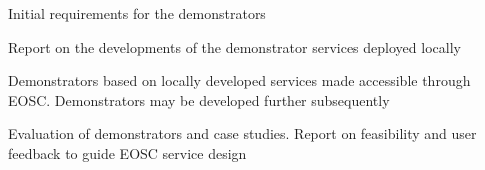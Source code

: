 \begin{workpackage}
\begin{wpdescription}
\end{wpdescription}

\begin{tasklist}
% 








\end{tasklist}



\begin{wpdelivs}

  \begin{wpdeliv}[due=12,miles=startup,id=codesign-support,dissem=PU,nature=R,lead=SRL]
    {Initial requirements for the demonstrators}
  \end{wpdeliv}

  \begin{wpdeliv}[due=24,miles=prototype,id=local-services,dissem=PU,nature=R,lead=EP]
    {Report on the developments of the demonstrator services deployed locally}
  \end{wpdeliv}

  \begin{wpdeliv}[due=36,miles=community,id=demonstrators,dissem=PU,nature=DEM,lead=EGI]
    {Demonstrators based on locally developed services made accessible
      through EOSC. Demonstrators may be developed further subsequently}
  \end{wpdeliv}

  \begin{wpdeliv}[due=48,miles=final,id=applications-report,dissem=PU,nature=R,lead=XFEL]
    {Evaluation of demonstrators and case studies. Report on
      feasibility and user feedback to guide EOSC service design}
  \end{wpdeliv}

\end{wpdelivs}
\end{workpackage}

